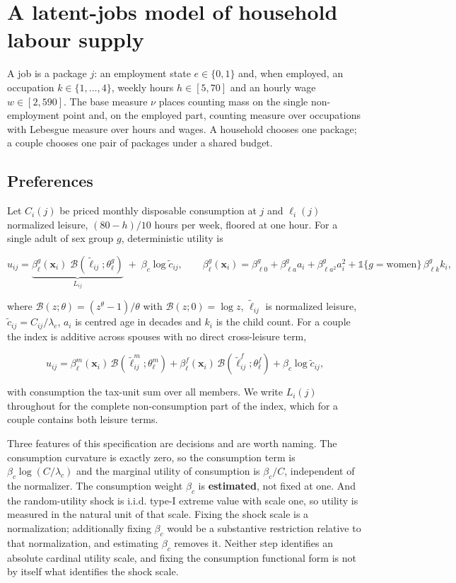 \section{A latent-jobs model of household labour supply}\label{a-latent-jobs-model-of-household-labour-supply}

A job is a package \(j\): an employment state \(e\in\{0,1\}\) and, when employed, an occupation \(k\in\{1,\dots,4\}\), weekly hours \(h\in[5,70]\) and an hourly wage \(w\in[2,590]\). The base measure \(\nu\) places counting mass on the single non-employment point and, on the employed part, counting measure over occupations with Lebesgue measure over hours and wages. A household chooses one package; a couple chooses one pair of packages under a shared budget.

\subsection{Preferences}\label{preferences}

Let \(C_i(j)\) be priced monthly disposable consumption at \(j\) and \(\ell_i(j)\) normalized leisure, \((80-h)/10\) hours per week, floored at one hour. For a single adult of sex group \(g\), deterministic utility is

\[
u_{ij}=\underbrace{\beta_{\ell}^{g}(\mathbf x_i)\;
\mathcal B\!\left(\tilde\ell_{ij};\theta_{\ell}^{g}\right)}_{L_{ij}}
\;+\;\beta_c\log\tilde c_{ij},
\qquad
\beta_{\ell}^{g}(\mathbf x_i)=\beta_{\ell 0}^{g}+\beta_{\ell a}^{g}a_i
+\beta_{\ell a^{2}}^{g}a_i^{2}
+\mathbb 1\{g=\text{women}\}\,\beta_{\ell k}^{g}k_i,
\]

where \(\mathcal B(z;\theta)=(z^{\theta}-1)/\theta\) with \(\mathcal B(z;0)=\log z\), \(\tilde\ell_{ij}\) is normalized leisure, \(\tilde c_{ij}=C_{ij}/\lambda_c\), \(a_i\) is centred age in decades and \(k_i\) is the child count. For a couple the index is additive across spouses with no direct cross-leisure term,

\[
u_{ij}=\beta_{\ell}^{m}(\mathbf x_i)\,\mathcal B(\tilde\ell^{m}_{ij};\theta_{\ell}^{m})
      +\beta_{\ell}^{f}(\mathbf x_i)\,\mathcal B(\tilde\ell^{f}_{ij};\theta_{\ell}^{f})
      +\beta_c\log\tilde c_{ij},
\]

with consumption the tax-unit sum over all members. We write \(L_i(j)\) throughout for the complete non-consumption part of the index, which for a couple contains both leisure terms.

Three features of this specification are decisions and are worth naming. The consumption curvature is exactly zero, so the consumption term is \(\beta_c\log(C/\lambda_c)\) and the marginal utility of consumption is \(\beta_c/C\), independent of the normalizer. The consumption weight \(\beta_c\) is \textbf{estimated}, not fixed at one. And the random-utility shock is i.i.d. type-I extreme value with scale one, so utility is measured in the natural unit of that scale. Fixing the shock scale is a normalization; additionally fixing \(\beta_c\) would be a substantive restriction relative to that normalization, and estimating \(\beta_c\) removes it. Neither step identifies an absolute cardinal utility scale, and fixing the consumption functional form is not by itself what identifies the shock scale.

